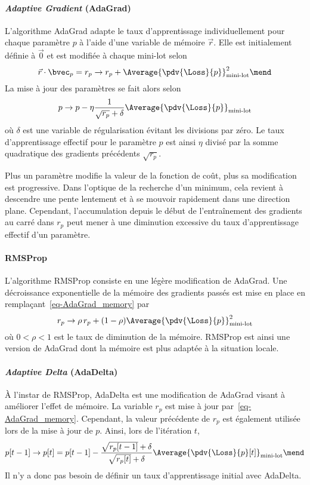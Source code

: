 \paragraph{\emph{Adaptive Gradient} (AdaGrad)} \cite{adagrad}
L'algorithme AdaGrad adapte le taux d'apprentissage individuellement pour chaque paramètre $p$
à l'aide d'une
variable de mémoire $\vec{r}$.
Elle est initialement définie à $\vec{0}$ et est modifiée à chaque mini-lot selon
\begin{equation}
\vec{r}\cdot\bvec_p = r_p \to r_p + \Average{\pdv{\Loss}{p}}_\text{mini-lot}^2
\label{eq-AdaGrad_memory}
\mend
\end{equation}
La mise à jour des paramètres se fait alors selon
\begin{equation}
p \to p - \eta \frac{1}{\sqrt{r_p}+\delta} \Average{\pdv{\Loss}{p}}_\text{mini-lot}
\end{equation}
où $\delta$ est une variable de régularisation évitant les divisions par zéro.
Le taux d'apprentissage effectif pour le paramètre $p$
est ainsi $\eta$ divisé par la somme quadratique des gradients précédents $\sqrt{r_p}$.
\par
Plus un paramètre modifie la valeur de la fonction de coût, plus sa modification est progressive.
Dans l'optique de la recherche d'un minimum, cela revient à descendre une pente lentement et à se mouvoir rapidement dans une direction plane.
Cependant, l'accumulation depuis le début de l'entraînement des gradients au carré dans $r_p$ peut mener à une diminution excessive du taux d'apprentissage effectif d'un paramètre.
\paragraph{RMSProp} \cite{RMSProp}
L'algorithme RMSProp consiste en une légère modification de AdaGrad.
Une décroissance exponentielle de la mémoire des gradients passés est mise en place en remplaçant~\eqref{eq-AdaGrad_memory} par
\begin{equation}
r_p \to \rho \, r_p + (1-\rho)\Average{\pdv{\Loss}{p}}_\text{mini-lot}^2
\end{equation}
où $0<\rho<1$ est le taux de diminution de la mémoire.
RMSProp est ainsi une version de AdaGrad dont la mémoire est plus adaptée à la situation locale.
\paragraph{\emph{Adaptive Delta} (AdaDelta)}
À l'instar de RMSProp, AdaDelta est une modification de AdaGrad visant à améliorer l'effet de mémoire.
La variable $r_p$ est mise à jour par~\eqref{eq-AdaGrad_memory}.
Cependant, la valeur précédente de $r_p$ est également utilisée lors de la mise à jour de $p$.
Ainsi, lors de l'itération $t$,
\begin{equation}
p [t-1] \to p [t] = p[t-1] - \frac{\sqrt{r_p[t-1]}+\delta}{\sqrt{r_p[t]}+\delta} \Average{\pdv{\Loss}{p} [t]}_\text{mini-lot}
\mend
\end{equation}
Il n'y a donc pas besoin de définir un taux d'apprentissage initial avec AdaDelta.
